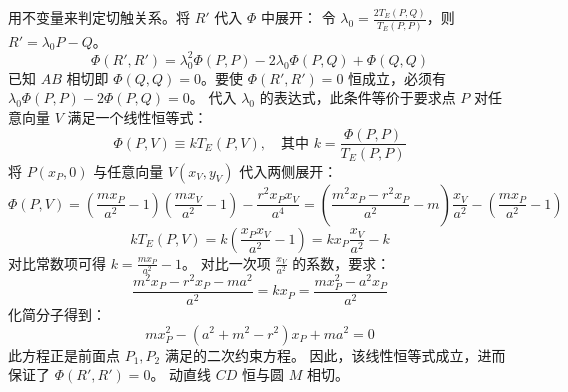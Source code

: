 \begin{solution}
用不变量来判定切触关系。将 $R'$ 代入 $\Phi$ 中展开：
令 $\lambda_0 = \frac{2 T_E(P, Q)}{T_E(P, P)}$，则 $R' = \lambda_0 P - Q$。
$$ \Phi(R', R') = \lambda_0^2 \Phi(P, P) - 2\lambda_0 \Phi(P, Q) + \Phi(Q, Q) $$
已知 $AB$ 相切即 $\Phi(Q, Q) = 0$。要使 $\Phi(R', R') = 0$ 恒成立，必须有 $\lambda_0 \Phi(P, P) - 2 \Phi(P, Q) = 0$。
代入 $\lambda_0$ 的表达式，此条件等价于要求点 $P$ 对任意向量 $V$ 满足一个线性恒等式：
$$ \Phi(P, V) \equiv k T_E(P, V), \quad \text{其中 } k = \frac{\Phi(P, P)}{T_E(P, P)} $$
将 $P(x_P, 0)$ 与任意向量 $V(x_V, y_V)$ 代入两侧展开：
$$ \Phi(P, V) = \left( \frac{m x_P}{a^2} - 1 \right)\left( \frac{m x_V}{a^2} - 1 \right) - \frac{r^2 x_P x_V}{a^4} = \left( \frac{m^2 x_P - r^2 x_P}{a^2} - m \right) \frac{x_V}{a^2} - \left( \frac{m x_P}{a^2} - 1 \right) $$
$$ k T_E(P, V) = k \left( \frac{x_P x_V}{a^2} - 1 \right) = k x_P \frac{x_V}{a^2} - k $$
对比常数项可得 $k = \frac{m x_P}{a^2} - 1$。
对比一次项 $\frac{x_V}{a^2}$ 的系数，要求：
$$ \frac{m^2 x_P - r^2 x_P - m a^2}{a^2} = k x_P = \frac{m x_P^2 - a^2 x_P}{a^2} $$
化简分子得到：
$$ m x_P^2 - (a^2 + m^2 - r^2)x_P + m a^2 = 0 $$
此方程正是前面点 $P_1, P_2$ 满足的二次约束方程。
因此，该线性恒等式成立，进而保证了 $\Phi(R', R') = 0$。
动直线 $CD$ 恒与圆 $M$ 相切。
\end{solution}

